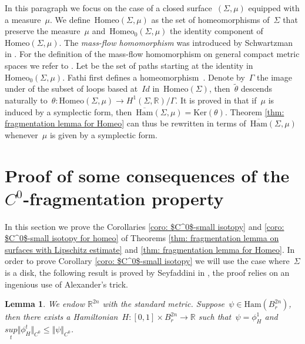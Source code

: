 \documentclass[10pt]{amsart}
\newtheorem{lemma}[prop]{Lemma}
\newcommand{\Ham}{\mathrm{Ham}}
\newcommand{\Homeo}{\mathrm{Homeo}}
\newcommand{\Ker}{\mathrm{Ker}}
\begin{document}
\bigskip

In this paragraph we focus on the case of a closed surface~$(\Sigma,\mu)$ equipped with a measure~$\mu$. We define~$\Homeo(\Sigma,\mu)$ as the set of homeomorphisms of~$\Sigma$ that preserve the measure~$\mu$ and~$\Homeo_0(\Sigma,\mu)$ the identity component of~$\Homeo(\Sigma,\mu)$. The \textit{mass-flow homomorphism} was introduced by Schwartzman in \cite{Schwartzman}. For the definition of the mass-flow homomorphism on general compact metric spaces we refer to \cite[Section 0]{Fathi}. Let \smash[t]{$\widetilde{\Homeo}(\Sigma, \mu)$} be the set of paths starting at the identity in~$\Homeo_{0}(\Sigma,\mu)$. Fathi first defines a homeomorphism~\smash[t]{$\widetilde{\theta}: \widetilde{\Homeo_{0}}(\Sigma, \mu)\rightarrow H^1(\Sigma,\mathbb{R})$}. Denote by~$\Gamma$ the image under \smash[t]{$\widetilde{\theta}$} of the subset of loops based at~$Id$ in~$\Homeo(\Sigma)$, then~$\widetilde{\theta}$ descends naturally to~$\theta: \Homeo(\Sigma,\mu)\rightarrow H^1(\Sigma,\mathbb{R})/\Gamma$.  It is proved in \cite{Lefeuvre} that if~$\mu$ is induced by a symplectic form, then~$\overline{\Ham}(\Sigma,\mu)=\Ker(\theta)$. Theorem \ref{thm: fragmentation lemma for Homeo} can thus be rewritten in terms of~$\overline{\Ham}(\Sigma,\mu)$ whenever~$\mu$ is given by a symplectic form.


\section{Proof of some consequences of the $C^0$-fragmentation property}\label{sec: proof of the corollaries}

In this section we prove the Corollaries \ref{coro: $C^0$-small isotopy} and \ref{coro: $C^0$-small isotopy for homeo} of Theorems \ref{thm: fragmentation lemma on surfaces with Lipschitz estimate} and \ref{thm: fragmentation lemma for Homeo}. In order to prove Corollary \ref{coro: $C^0$-small isotopy} we will use the case where~$\Sigma$ is a disk, the following result is proved by Seyfaddini in \cite[Lemma 3.2]{Seyfaddini}, the proof relies on an ingenious use of Alexander's trick.

\begin{lemma}\label{lem: clever Alexander's trick}
	We endow $\mathbb R ^{2n}$ with the standard metric. Suppose~$\psi \in \Ham(B_r^{2n})$,  then there exists a Hamiltonian~$H: [0,1] \times B_r^{2n} \rightarrow \mathbb{R}$ such that~$\psi=\phi_H^1$ and~$\underset{t}{sup} \Vert \phi_H^t \Vert_{C^0}\leq \Vert \psi \Vert_{C^0}$.
\end{lemma}
\end{document}
